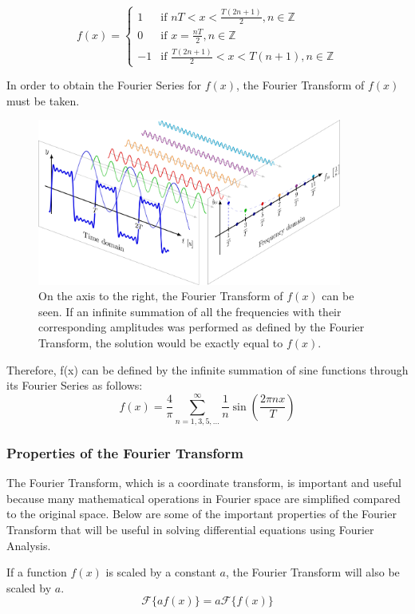\begin{equation}
f(x)=
    \begin{cases}
        1 & \text{if } nT < x < \frac{T(2n+1)}{2} , n \in \mathbb{Z}\\
        0 & \text{if } x = \frac{nT}{2} , n \in \mathbb{Z}\\
        -1 & \text{if } \frac{T(2n+1)}{2} < x < T(n+1) , n \in \mathbb{Z}
    \end{cases}
\end{equation}

In order to obtain the Fourier Series for \(f(x)\), the Fourier Transform of \(f(x)\) must be taken.

\begin{figure}[H]
    \centering
    \includegraphics[width=100mm,height=\textheight,keepaspectratio]{images/step_function_fourier_series.png}
    \caption{On the axis to the right, the Fourier Transform of \(f(x)\) can be seen. If an infinite summation of all the frequencies with their corresponding amplitudes was performed as defined by the Fourier Transform, the solution would be exactly equal to \(f(x)\).}
    \label{fig:decomposed_step_function}
\end{figure}

Therefore, f(x) can be defined by the infinite summation of sine functions through its Fourier Series as follows: 
\[f(x)=\frac{4}{\pi}\sum_{n=1,3,5,...}^{\infty} \frac{1}{n} \sin \left( \frac{2 \pi n x}{T}
 \right) \]

\subsubsection{Properties of the Fourier Transform}
The Fourier Transform, which is a coordinate transform, is important and useful because many mathematical operations in Fourier space are simplified compared to the original space. Below are some of the important properties of the Fourier Transform that will be useful in solving differential equations using Fourier Analysis.
\begin{lemma}
    \label{fourier_scaling}
    If a function \(f(x)\) is scaled by a constant $a$, the Fourier Transform will also be scaled by $a$.
    \[ \mathcal{F}\{ a f(x) \} = a \mathcal{F}\{ f(x) \} \]
\end{lemma}

